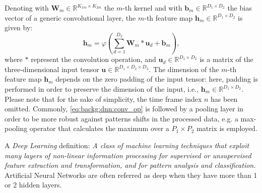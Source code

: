 \begin{enumerate}
Denoting with $\mathbf{W}_{m} \in \mathbb{R}^{K_{1m}\times K_{2m}}$ the $m$-th kernel and with $\mathbf{b}_{m}  \in \mathbb{R}^{D_1\times D_2}$ the bias vector of a generic convolutional layer, the $m$-th feature map  $\mathbf{h}_{m} \in \mathbb{R}^{D_1\times D_2}$ is given by:
\begin{equation}\label{eq:backg:dnn:conv_op}
\mathbf{h}_{m}=\varphi	\left(\sum_{d=1}^{D_3} \mathbf{W}_{m} \ast \mathbf{u}_d + \mathbf{b}_{m} \right),
\end{equation}
where $\ast$ represent the convolution operation, and $\mathbf{u}_{d} \in \mathbb{R}^{D_1\times D_2} $ is a matrix of the three-dimensional input tensor $\mathbf{u} \in \mathbb{R}^{D_1\times D_2 \times D_3}$. The dimension of the $m$-th feature map $\mathbf{h}_{m}$ depends on the zero padding of the input tensor: here, padding is performed in order to preserve the dimension of the input, i.e., $\mathbf{h}_{m} \in \mathbb{R}^{D_1\times D_2}$. Please note that for the sake of simplicity, the time frame index $n$ has been omitted.  %
Commonly, \eqref{eq:backg:dnn:conv_op} is followed by a pooling layer in order to be more robust against patterns shifts in the processed data, e.g. a max-pooling operator that calculates the maximum over a $P_1 \times P_2 $ matrix is employed.

\end{enumerate}


A \textit{Deep Learning} definition: \textit{A  class  of  machine learning  techniques  that
exploit  many  layers  of  non-linear  information  processing  for supervised  or  unsupervised  feature  extraction  and  transformation, and for pattern analysis and classification.}
Artificial Neural Networks are often referred as deep when they have more than 1 or 2 hidden layers.


